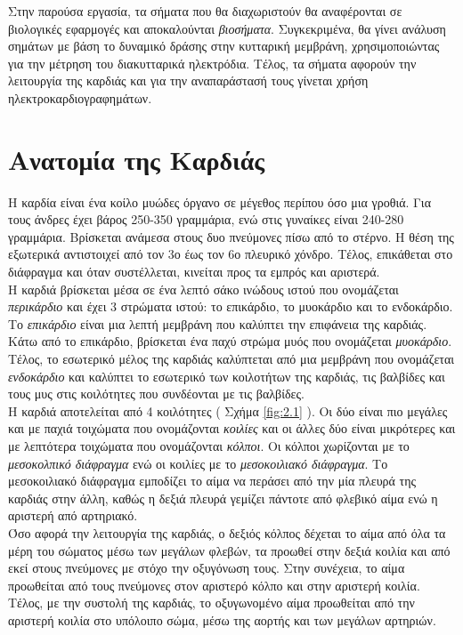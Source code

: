\justifying
Στην παρούσα εργασία, τα σήματα που θα διαχωριστούν θα αναφέρονται σε βιολογικές εφαρμογές και αποκαλούνται \emph{βιοσήματα}. Συγκεκριμένα, θα γίνει ανάλυση σημάτων με βάση το δυναμικό δράσης στην κυτταρική μεμβράνη, χρησιμοποιώντας για την μέτρηση του διακυτταρικά ηλεκτρόδια. Τέλος, τα σήματα αφορούν την λειτουργία της καρδιάς και για την αναπαράστασή τους γίνεται χρήση ηλεκτροκαρδιογραφημάτων. 
\section{Ανατομία της Καρδιάς}
\justifying
Η καρδία \cite{heart:23} \cite{heart:26} είναι ένα κοίλο μυώδες όργανο σε μέγεθος περίπου όσο μια γροθιά. Για τους άνδρες έχει βάρος 250-350 γραμμάρια, ενώ στις γυναίκες είναι 240-280 γραμμάρια. Βρίσκεται ανάμεσα στους δυο πνεύμονες πίσω από το στέρνο. Η θέση της εξωτερικά αντιστοιχεί από τον 3ο έως τον 6ο πλευρικό χόνδρο. Τέλος, επικάθεται στο διάφραγμα και όταν συστέλλεται, κινείται προς τα εμπρός και αριστερά.
\\[0.3 \baselineskip]
Η καρδιά βρίσκεται μέσα σε ένα λεπτό σάκο ινώδους ιστού που ονομάζεται \emph{περικάρδιο} και έχει 3 στρώματα ιστού: το επικάρδιο, το μυοκάρδιο και το ενδοκάρδιο. Το \emph{επικάρδιο} είναι μια λεπτή μεμβράνη που καλύπτει την επιφάνεια της καρδιάς. Κάτω από το επικάρδιο, βρίσκεται ένα παχύ στρώμα μυός που ονομάζεται \emph{μυοκάρδιο}. Τέλος, το εσωτερικό μέλος της καρδιάς καλύπτεται από μια μεμβράνη που ονομάζεται \emph{ενδοκάρδιο} και καλύπτει το εσωτερικό των κοιλοτήτων της καρδιάς, τις βαλβίδες και τους μυς στις κοιλότητες που συνδέονται με τις βαλβίδες.
\\[0.3 \baselineskip]
Η καρδιά αποτελείται από 4 κοιλότητες ( Σχήμα \ref{fig:2.1} ). Οι δύο είναι πιο μεγάλες και με παχιά τοιχώματα που ονομάζονται \emph{κοιλίες} και οι άλλες δύο είναι μικρότερες και με λεπτότερα τοιχώματα που ονομάζονται \emph{κόλποι}. Οι κόλποι χωρίζονται με το \emph{μεσοκολπικό διάφραγμα} ενώ οι κοιλίες με το \emph{μεσοκοιλιακό διάφραγμα}. Το μεσοκοιλιακό διάφραγμα εμποδίζει το αίμα να περάσει από την μία πλευρά της καρδιάς στην άλλη, καθώς η δεξιά πλευρά γεμίζει πάντοτε από φλεβικό αίμα ενώ η αριστερή από αρτηριακό.
\\[0.3 \baselineskip]
Όσο αφορά την λειτουργία της καρδιάς, ο δεξιός κόλπος δέχεται το αίμα από όλα τα μέρη του σώματος μέσω των μεγάλων φλεβών, τα προωθεί στην δεξιά κοιλία και από εκεί στους πνεύμονες με στόχο την οξυγόνωση τους. Στην συνέχεια, το αίμα προωθείται από τους πνεύμονες στον αριστερό κόλπο και στην αριστερή κοιλία. Τέλος, με την συστολή της καρδιάς, το οξυγωνομένο αίμα προωθείται από την αριστερή κοιλία στο υπόλοιπο σώμα, μέσω της αορτής και των μεγάλων αρτηριών.
